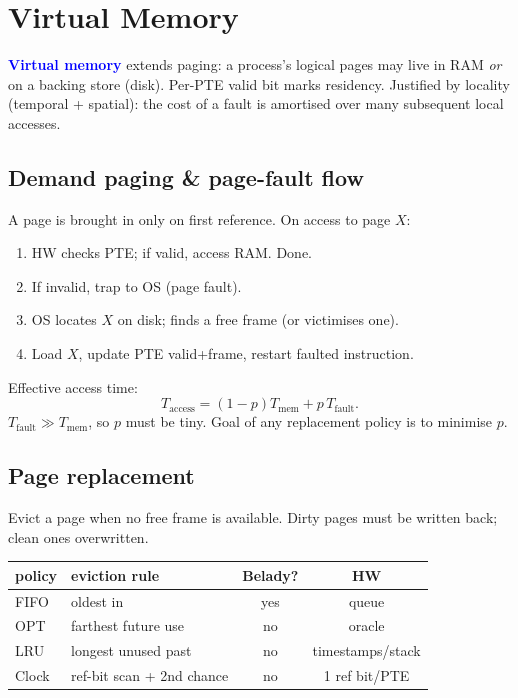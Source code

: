 \section{Virtual Memory}
\textcolor{Blue}{\textbf{Virtual memory}} extends paging: a process's logical pages may live in RAM \emph{or} on a backing store (disk). Per-PTE \textcolor{Bittersweet}{valid bit} marks residency. Justified by \textcolor{Bittersweet}{locality} (temporal + spatial): the cost of a fault is amortised over many subsequent local accesses.

\subsection{Demand paging \& page-fault flow}
A page is brought in only on first reference. On access to page $X$:
\begin{enumerate}
  \item HW checks PTE; if valid, access RAM. Done.
  \item If invalid, trap to OS (\textcolor{Bittersweet}{page fault}).
  \item OS locates $X$ on disk; finds a free frame (or victimises one).
  \item Load $X$, update PTE valid+frame, restart faulted instruction.
\end{enumerate}
\textcolor{Bittersweet}{Effective access time}:
\[T_{\mathrm{access}}=(1-p)T_{\mathrm{mem}}+p\,T_{\mathrm{fault}}.\]
$T_{\mathrm{fault}}\!\gg\!T_{\mathrm{mem}}$, so $p$ must be tiny. Goal of any replacement policy is to minimise $p$.

\subsection{Page replacement}
Evict a page when no free frame is available. \textcolor{Bittersweet}{Dirty} pages must be written back; clean ones overwritten.

\begin{tabular}{@{}llcc@{}}
\toprule
policy & eviction rule & Belady? & HW \\
\midrule
FIFO & oldest in & yes & queue \\
OPT  & farthest future use & no & oracle \\
LRU  & longest unused past & no & timestamps/stack \\
Clock & ref-bit scan + 2nd chance & no & 1 ref bit/PTE \\
\bottomrule
\end{tabular}

